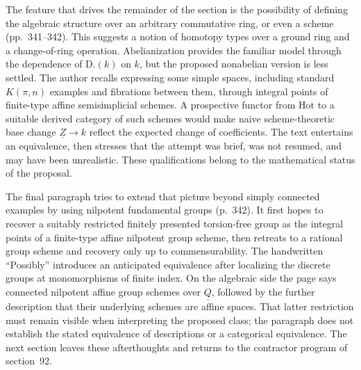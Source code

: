 The feature that drives the remainder of the section is the possibility of defining the algebraic structure over an arbitrary commutative ring, or even a scheme (pp.~341--342). This suggests a notion of homotopy types over a ground ring and a change-of-ring operation. Abelianization provides the familiar model through the dependence of $\mathrm{D.}(k)$ on $k$, but the proposed nonabelian version is less settled. The author recalls expressing some simple spaces, including standard $K(\pi,n)$ examples and fibrations between them, through integral points of finite-type affine semisimplicial schemes. A prospective functor from $\mathrm{Hot}$ to a suitable derived category of such schemes would make naive scheme-theoretic base change $\underline Z\to k$ reflect the expected change of coefficients. The text entertains an equivalence, then stresses that the attempt was brief, was not resumed, and may have been unrealistic. These qualifications belong to the mathematical status of the proposal.

The final paragraph tries to extend that picture beyond simply connected examples by using nilpotent fundamental groups (p.~342). It first hopes to recover a suitably restricted finitely presented torsion-free group as the integral points of a finite-type affine nilpotent group scheme, then retreats to a rational group scheme and recovery only up to commensurability. The handwritten ``Possibly'' introduces an anticipated equivalence after localizing the discrete groups at monomorphisms of finite index. On the algebraic side the page says connected nilpotent affine group schemes over $\underline Q$, followed by the further description that their underlying schemes are affine spaces. That latter restriction must remain visible when interpreting the proposed class; the paragraph does not establish the stated equivalence of descriptions or a categorical equivalence. The next section leaves these afterthoughts and returns to the contractor program of section~92.

